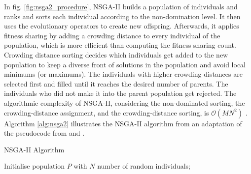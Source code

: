 \documentclass[mscthesis, 11pt]{usiinfthesis}
\theoremstyle{newdefinition}
\begin{document}
In fig. \ref{fig:nsga2_procedure}, NSGA-II builds a population of individuals and ranks and sorts each individual according to the non-domination level. It then uses the evolutionary operators to create new offspring. Afterwards, it applies fitness sharing by adding a crowding distance to every individual of the population, which is more efficient than computing the fitness sharing count. 
\\
Crowding distance sorting decides which individuals get added to the new population to keep a diverse front of solutions in the population and avoid local minimums (or maximums). The individuals with higher crowding distances are selected first and filled until it reaches the desired number of parents. The individuals who did not make it into the parent population get rejected.
The algorithmic complexity of NSGA-II, considering the non-dominated sorting, the crowding-distance assignment, and the crowding-distance sorting, is $\mathcal{O}(MN^2)$ \cite[~p.~186]{deb_fast_2002}.
Algorithm \ref{alg:nsga2} illustrates the NSGA-II algorithm from an adaptation of the pseudocode from \cite[~p.~93]{coello_coello_basic_2007} and \cite[~p.~186]{deb_fast_2002}.
\begin{algorithm}[ht]
  \caption{NSGA-II Algorithm}\label{alg:nsga2}
  Initialise population $P$ with $N$ number of random individuals;\\
\end{algorithm}
\clearpage
\end{document}
